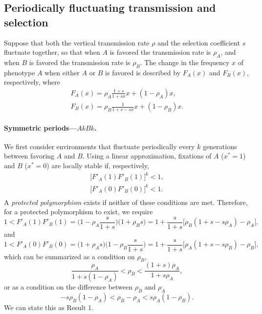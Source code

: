 \documentclass[14pt]{extarticle}
\begin{document}
\subsection*{Periodically fluctuating transmission and selection}

Suppose that both the vertical transmission rate $\rho$ and the selection coefficient $s$ fluctuate together, so that when $A$ is favored the transmission rate is $\rho_A$, and when $B$ is favored the transmission rate is $\rho_B$.
The change in the frequency $x$ of phenotype $A$ when either $A$ or $B$ is favored is described by $F_A(x)$ and $F_B(x)$, respectively, where
\begin{equation}\begin{aligned} \label{eq:recurrence_periodic_fluc}
F_A(x) = \rho_A \frac{1+s}{1+sx} x + (1-\rho_A)x, \\
F_B(x) = \rho_B \frac{1}{1+s-sx} x + (1-\rho_B)x.
\end{aligned}\end{equation}

\paragraph{Symmetric periods---$AkBk$.}
We first consider environments that fluctuate periodically every $k$ generations between favoring $A$ and $B$.
Using a linear approximation, fixations of $A$ ($x^*=1$) and $B$ ($x^*=0$) are locally stable if, respectively,
\begin{equation}\begin{aligned}
\big[F'_A(1) F'_B(1)\big]^k < 1, \\
\big[F'_A(0) F'_B(0)\big]^k < 1. \\
\end{aligned}\end{equation}
A \emph{protected polymorphism} exists if neither of these conditions are met.
Therefore, for a protected polymorphism to exist, we require
\begin{equation}
1 < F'_A(1) F'_B(1) = \Big(1-\rho_A\frac{s}{1+s}\Big)\Big(1+\rho_B s\Big) 
= 1+\frac{s}{1+s}\big[\rho_B(1+s-s\rho_A)-\rho_A\big],
\end{equation}
and
\begin{equation}
1 < F'_A(0) F'_B(0) = \Big(1+\rho_A s\Big)\Big(1-\rho_B \frac{s}{1+s}\Big) 
= 1+\frac{s}{1+s}\big[\rho_A(1+s-s\rho_B)-\rho_B\big],
\end{equation}
which can be summarized as a condition on $\rho_B$,
\begin{equation} \label{eq:poly_condition_periodic_fluc}
\frac{\rho_A}{1+s(1-\rho_A)} < \rho_B < \frac{(1+s)\rho_A}{1+s\rho_A},
\end{equation}
or as a condition on the difference between $\rho_B$ and $\rho_A$
\begin{equation}
-s\rho_B(1-\rho_A) < \rho_B - \rho_A < s\rho_A(1-\rho_B).
\end{equation}
We can state this as Result 1. 
\end{document}
